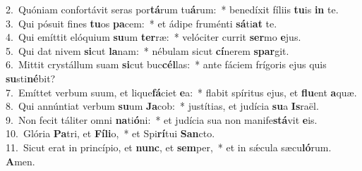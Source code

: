 {2.~}Quóniam confortávit seras por\textbf{tá}rum tu\textbf{á}rum:~* benedíxit fíliis \textbf{tu}is \textbf{in} te.\\
{3.~}Qui pósuit fines \textbf{tu}os \textbf{pa}cem:~* et ádipe fruménti \textbf{sá}ti\textbf{at} te.\\
{4.~}Qui emíttit elóquium \textbf{su}um \textbf{ter}ræ:~* velóciter currit \textbf{ser}mo \textbf{e}jus.\\
{5.~}Qui dat nivem \textbf{si}cut \textbf{la}nam:~* nébulam sicut \textbf{cí}nerem \textbf{spar}git.\\
{6.~}Mittit crystállum suam \textbf{si}cut buc\textbf{cél}las:~* ante fáciem frígoris ejus quis \textbf{su}sti\textbf{né}bit?\\
{7.~}Emíttet verbum suum, et lique\textbf{fá}ciet \textbf{e}a:~* flabit spíritus ejus, et \textbf{flu}ent \textbf{a}quæ.\\
{8.~}Qui annúntiat verbum \textbf{su}um \textbf{Ja}cob:~* justítias, et judícia \textbf{su}a \textbf{Is}raël.\\
{9.~}Non fecit táliter omni \textbf{na}ti\textbf{ó}ni:~* et judícia sua non manife\textbf{stá}vit \textbf{e}is.\\
{10.~}Glória \textbf{Pa}tri, et \textbf{Fí}\textbf{li}o,~* et Spi\textbf{rí}tui \textbf{San}cto.\\
{11.~}Sicut erat in princípio, et \textbf{nunc}, et \textbf{sem}per,~* et in sǽcula sæcu\textbf{ló}rum. \textbf{A}men.\\
